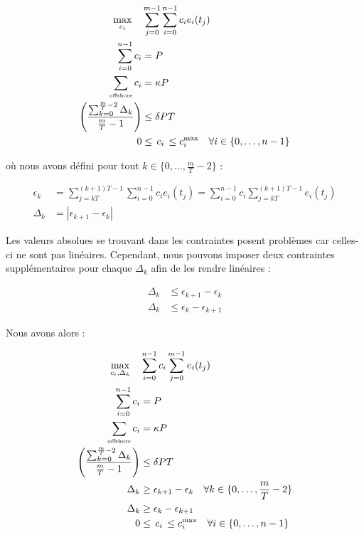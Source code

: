 \documentclass{article}
\begin{document}
\begin{align*}
    \max_{c_i} \quad  
    &\sum_{j = 0}^{m-1} \sum_{i = 0}^{n-1} c_i e_i(t_j) \\ 
    \sum_{i=0}^{n-1} c_i &= P\\
    \sum_{\text{\tiny offshore}}c_i &= \kappa P\\
    \left( \frac{\sum_{k = 0}^{\frac{m}{T} - 2} \Delta_k }{\frac{m}{T} - 1}\right) &\leq \delta PT\\
    0 &\le \, c_i \, \le c_i^{\max} \quad \forall i \in \{0, \ldots, n-1\}
\end{align*}

où nous avons défini pour tout $k \in \{ 0, \ldots, \frac{m}{T} - 2 \}$ :

\begin{align*}
    \epsilon_k &= \sum_{j = kT}^{(k+1)T - 1} \sum_{i = 0}^{n-1} c_i e_i(t_j) = \sum_{i=0}^{n-1} c_i \sum_{j = kT}^{(k+1)T - 1} e_i(t_j)\\
    \Delta_k &= | \epsilon_{k+1} - \epsilon_k |
\end{align*}

Les valeurs absolues se trouvant dans les contraintes posent problèmes car celles-ci ne sont pas linéaires. Cependant, nous pouvons imposer deux contraintes supplémentaires pour chaque $\Delta_k$ afin de les rendre linéaires :

\begin{align*}
    \Delta_k &\leq \epsilon_{k+1} - \epsilon_k\\
    \Delta_k &\leq \epsilon_k - \epsilon_{k+1}
\end{align*}

Nous avons alors :

\begin{align*}
    \max_{c_i, \Delta_k} \quad  
    &\sum_{i=0}^{n-1} c_i \sum_{j = 0}^{m - 1} e_i(t_j) \\ 
    \sum_{i=0}^{n-1} c_i &= P\\
    \sum_{\text{\tiny offshore}}c_i &= \kappa P\\
    \left( \frac{\sum_{k = 0}^{\frac{m}{T} - 2} \Delta_k }{\frac{m}{T} - 1}\right) &\leq \delta PT\\
    \Delta_k &\ge \epsilon_{k+1} - \epsilon_k \quad \forall k \in \{ 0, \ldots, \frac{m}{T} - 2 \}\\
    \Delta_k &\ge \epsilon_k - \epsilon_{k+1}\\
    0 &\le \, c_i \, \le c_i^{\max} \quad \forall i \in \{0, \ldots, n-1\}
\end{align*}
\end{document}
